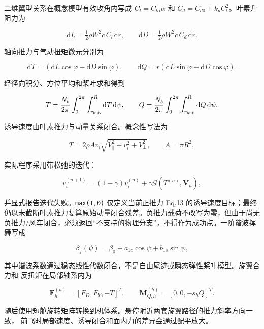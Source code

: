 \documentclass[UTF8,12pt,oneside,openany,fontset=windows]{ctexbook}
\begin{document}
二维翼型关系在概念模型有效攻角内写成 \(C_l=C_{l\alpha}\alpha\) 和 \(C_d=C_{d0}+k_dC_l^2\)。叶素升阻力为

\begin{equation}
\mathrm dL=\tfrac12\rho W^2c\,C_l\,\mathrm dr,\qquad
\mathrm dD=\tfrac12\rho W^2c\,C_d\,\mathrm dr.
\end{equation}

轴向推力与气动扭矩微元分别为

\begin{equation}
\mathrm dT=(\mathrm dL\cos\varphi-\mathrm dD\sin\varphi),\qquad
\mathrm dQ=r(\mathrm dL\sin\varphi+\mathrm dD\cos\varphi).
\end{equation}

经径向积分、方位平均和桨叶求和得到

\begin{equation}
T=\frac{N_b}{2\pi}\int_0^{2\pi}\int_{r_{\rm hub}}^R\mathrm dT\,\mathrm d\psi,
\qquad
Q=\frac{N_b}{2\pi}\int_0^{2\pi}\int_{r_{\rm hub}}^R\mathrm dQ\,\mathrm d\psi .
\end{equation}

诱导速度由叶素推力与动量关系闭合。概念性写法为

\begin{equation}
T=2\rho A v_i\sqrt{V_\parallel^2+v_i^2+V_\perp^2},
\qquad A=\pi R^2,
\end{equation}

实际程序采用带松弛的迭代：

\begin{equation}
v_i^{(n+1)}=(1-\gamma)v_i^{(n)}+\gamma\mathcal G(T^{(n)},\mathbf V_h),
\end{equation}

并显式报告迭代失败。\texttt{max(T,0)} 仅定义当前正推力 Eq.13 的诱导速度目标；最终仍以未截断叶素推力复算原始动量闭合残差。负推力载荷不改写为零，但由于尚无负推力/风车闭合，必须返回“不支持的物理分支”，不得作为成功点。一阶谐波挥舞写成

\begin{equation}
\beta_f(\psi)=\beta_0+a_{1c}\cos\psi+b_{1s}\sin\psi,
\end{equation}

其中谐波系数通过稳态线性代数闭合，不是自由尾迹或瞬态弹性桨叶模型。旋翼合力和 反扭矩在局部轴系内为

\begin{equation}
\mathbf F_h^{(h)}=[F_D,F_Y,-T]^T,\qquad
\mathbf M_{Q,h}^{(h)}=[0,0,-s_hQ]^T.
\end{equation}

随后使用短舱旋转矩阵转换到机体系。悬停附近两套旋翼路径的推力斜率方向一致， 前飞时局部速度、诱导闭合和面内力的差异会通过配平放大。
\end{document}
